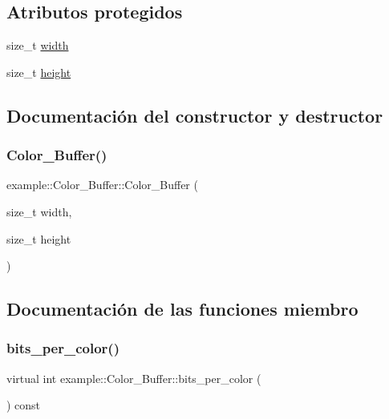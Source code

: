 \subsection*{Atributos protegidos}
\begin{DoxyCompactItemize}
\item 
size\+\_\+t \mbox{\hyperlink{classexample_1_1_color___buffer_ab61454d4b35cbba00d2e634d14ed20ac}{width}}
\item 
size\+\_\+t \mbox{\hyperlink{classexample_1_1_color___buffer_ae01f4538ee30af1d3072a425c5ad37ac}{height}}
\end{DoxyCompactItemize}


\subsection{Documentación del constructor y destructor}
\mbox{\label{classexample_1_1_color___buffer_a44c19770a14b0f8e46e7ceda1df5fc3d}} 
\subsubsection{\texorpdfstring{Color\_Buffer()}{Color\_Buffer()}}
{\footnotesize\ttfamily example\+::\+Color\+\_\+\+Buffer\+::\+Color\+\_\+\+Buffer (\begin{DoxyParamCaption}\item[{size\+\_\+t}]{width,  }\item[{size\+\_\+t}]{height }\end{DoxyParamCaption})\hspace{0.3cm}{\ttfamily [inline]}}



\subsection{Documentación de las funciones miembro}
\mbox{\label{classexample_1_1_color___buffer_a76463553dc782f2dc24a61bec708e273}} 
\subsubsection{\texorpdfstring{bits\_per\_color()}{bits\_per\_color()}}
{\footnotesize\ttfamily virtual int example\+::\+Color\+\_\+\+Buffer\+::bits\+\_\+per\+\_\+color (\begin{DoxyParamCaption}{ }\end{DoxyParamCaption}) const\hspace{0.3cm}{\ttfamily [pure virtual]}}




